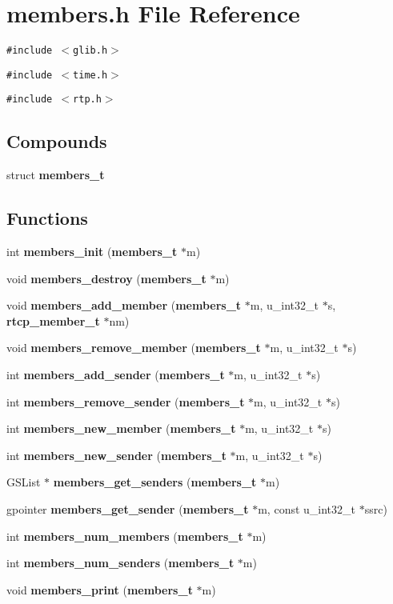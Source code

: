 \section{members.h File Reference}
\label{members_8h}
{\tt \#include $<$glib.h$>$}\par
{\tt \#include $<$time.h$>$}\par
{\tt \#include $<$rtp.h$>$}\par
\subsection*{Compounds}
\begin{CompactItemize}
\item 
struct {\bf members\_\-t}
\end{CompactItemize}
\subsection*{Functions}
\begin{CompactItemize}
\item 
int {\bf members\_\-init} ({\bf members\_\-t} $\ast$m)
\item 
void {\bf members\_\-destroy} ({\bf members\_\-t} $\ast$m)
\item 
void {\bf members\_\-add\_\-member} ({\bf members\_\-t} $\ast$m, u\_\-int32\_\-t $\ast$s, {\bf rtcp\_\-member\_\-t} $\ast$nm)
\item 
void {\bf members\_\-remove\_\-member} ({\bf members\_\-t} $\ast$m, u\_\-int32\_\-t $\ast$s)
\item 
int {\bf members\_\-add\_\-sender} ({\bf members\_\-t} $\ast$m, u\_\-int32\_\-t $\ast$s)
\item 
int {\bf members\_\-remove\_\-sender} ({\bf members\_\-t} $\ast$m, u\_\-int32\_\-t $\ast$s)
\item 
int {\bf members\_\-new\_\-member} ({\bf members\_\-t} $\ast$m, u\_\-int32\_\-t $\ast$s)
\item 
int {\bf members\_\-new\_\-sender} ({\bf members\_\-t} $\ast$m, u\_\-int32\_\-t $\ast$s)
\item 
GSList $\ast$ {\bf members\_\-get\_\-senders} ({\bf members\_\-t} $\ast$m)
\item 
gpointer {\bf members\_\-get\_\-sender} ({\bf members\_\-t} $\ast$m, const u\_\-int32\_\-t $\ast$ssrc)
\item 
int {\bf members\_\-num\_\-members} ({\bf members\_\-t} $\ast$m)
\item 
int {\bf members\_\-num\_\-senders} ({\bf members\_\-t} $\ast$m)
\item 
void {\bf members\_\-print} ({\bf members\_\-t} $\ast$m)
\end{CompactItemize}


